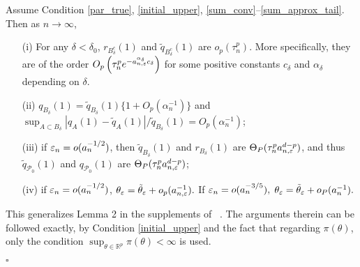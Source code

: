 \begin{lemma}\label{Alemma3.5} Assume Condition \ref{par_true}, \ref{initial_upper}, \ref{sum_conv}--\ref{sum_approx_tail}. Then as $n\rightarrow\infty$, 
	\begin{enumerate}
		\item[(i)] For any $\delta<\delta_{0}$, $r_{B_{\delta}^{c}}(1)$ and $\tilde{q}_{B_{\delta}^{c}}(1)$
		are $o_{p}(\tau_{n}^{p})$. More specifically, they are of the order
		$O_{p}\left(\tau_{n}^{p}e^{-a_{n,\varepsilon}^{\alpha_{\delta}}c_{\delta}}\right)$
		for some positive constants $c_{\delta}$ and $\alpha_{\delta}$ depending
		on $\delta$.
		\item[(ii)] $q_{B_{\delta}}(1)=\tilde{q}_{B_{\delta}}(1)\{1+O_{p}(\alpha_{n}^{-1})\}$
		and $\sup_{A\subset B_{\delta}}|q_{A}(1)-\tilde{q}_{A}(1)|/\tilde{q}_{B_{\delta}}(1)=O_{p}(\alpha_{n}^{-1})$; 
		\item[(iii)] if $\varepsilon_{n}=o(a_{n}^{-1/2})$, then $\tilde{q}_{B_{\delta}}(1)$ and
		$r_{B_{\delta}}(1)$ are $\Theta_{P}(\tau_{n}^{p}a_{n,\varepsilon}^{d-p})$,
		and thus $\tilde{q}_{\mathcal{P}_{0}}(1)$ and $q_{\mathcal{P}_{0}}(1)$
		are $\Theta_{P}(\tau_{n}^{p}a_{n,\varepsilon}^{d-p})$; 
		\item[(iv)] if $\varepsilon_{n}=o(a_{n}^{-1/2})$, $\theta_{\varepsilon}=\tilde{\theta}_{\varepsilon}+o_{p}(a_{n,\varepsilon}^{-1}).$
		If $\varepsilon_{n}=o(a_{n}^{-3/5}),$ $\theta_{\varepsilon}=\tilde{\theta}_{\varepsilon}+o_{P}(a_{n}^{-1}).$
	\end{enumerate} \end{lemma}
	This generalizes Lemma 2 in the supplements of ~\cite{Li2017}. The arguments therein
	can be followed exactly, by Condition \ref{initial_upper} and the fact that regarding $\pi(\theta)$,
	only the condition $\sup_{\theta\in\mathbb{R}^{p}}\pi(\theta)<\infty$
	is used.
	
	\hfill{$\square$} 
	
